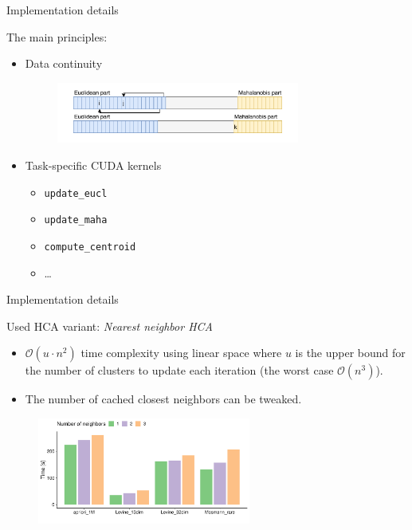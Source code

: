 \documentclass[10pt]{beamer}
\begin{document}
\begin{frame}{Implementation details}
	
	The main principles:
	\begin{itemize}
		\item Data continuity
		\begin{figure}
			\includegraphics[width=8cm]{../img/data}
		\end{figure}
		
		\item Task-specific CUDA kernels
		\begin{itemize}
			\item \texttt{update\_eucl}
			\item \texttt{update\_maha}
			\item \texttt{compute\_centroid}
			\item \dots
		\end{itemize}
	\end{itemize}

\end{frame}

\begin{frame}{Implementation details}
	
	Used HCA variant: \emph{Nearest neighbor HCA}
	\begin{itemize}
		\item $\mathcal{O}(u\cdot n^2)$ time complexity using linear space where $u$ is the upper bound for the number of clusters to update each iteration (the worst case $\mathcal{O}(n^3)$).
		\item The number of cached closest neighbors can be tweaked.
	\end{itemize}

	\begin{figure}
		\includegraphics[width=7cm]{../img/neighbor_compare}
	\end{figure}
	
\end{frame}
\end{document}
